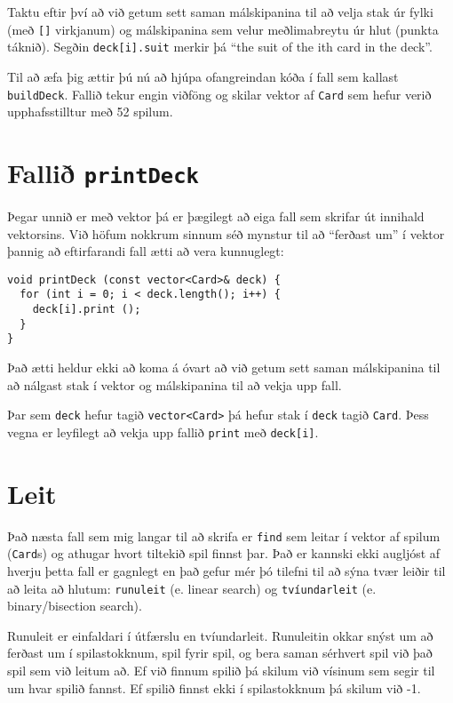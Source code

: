
Taktu eftir því að við getum sett saman málskipanina til að velja stak úr fylki (með {\tt []} virkjanum)
og málskipanina sem velur meðlimabreytu úr hlut (punkta táknið).
Segðin {\tt deck[i].suit} merkir þá ``the suit of the ith card in the deck''.


Til að æfa þig ættir þú nú að hjúpa ofangreindan kóða í fall sem kallast {\tt buildDeck}.
Fallið tekur engin viðföng og skilar vektor af {\tt Card} sem hefur verið upphafsstilltur með 52 spilum.

\section{Fallið {\tt printDeck}}
\label{printdeck}

Þegar unnið er með vektor þá er þægilegt að eiga fall sem skrifar út innihald vektorsins.
Við höfum nokkrum sinnum séð mynstur til að ``ferðast um'' í vektor þannig að eftirfarandi fall ætti að vera kunnuglegt:

\begin{verbatim}
void printDeck (const vector<Card>& deck) {
  for (int i = 0; i < deck.length(); i++) {
    deck[i].print ();
  }
}
\end{verbatim}
%
Það ætti heldur ekki að koma á óvart að við getum sett saman málskipanina til að nálgast stak í vektor og málskipanina til að vekja upp fall.

Þar sem {\tt deck} hefur tagið {\tt vector<Card>} þá hefur stak í {\tt deck} tagið {\tt Card}.
Þess vegna er leyfilegt að vekja upp fallið {\tt print} með {\tt deck[i]}.

\section{Leit}
\label{find}

Það næsta fall sem mig langar til að skrifa er {\tt find} sem leitar í vektor af spilum ({\tt Card}s)
og athugar hvort tiltekið spil finnst þar.
Það er kannski ekki augljóst af hverju þetta fall er gagnlegt en það gefur mér þó tilefni til að sýna
tvær leiðir til að leita að hlutum: {\tt runuleit} (e. linear search) og {\tt tvíundarleit} (e. binary/bisection search).


Runuleit er einfaldari í útfærslu en tvíundarleit.
Runuleitin okkar snýst um að ferðast um í spilastokknum, spil fyrir spil, og bera saman sérhvert spil við það spil sem við leitum að.
Ef við finnum spilið þá skilum við vísinum sem segir til um hvar spilið fannst.
Ef spilið finnst ekki í spilastokknum þá skilum við -1.

